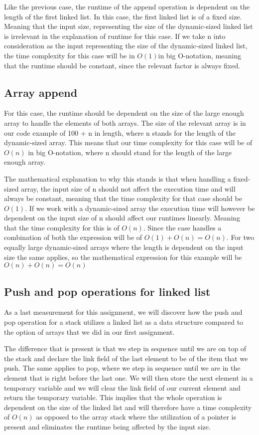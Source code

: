 \documentclass[a4paper,11pt]{article}
\begin{document}
        Like the previous case, the runtime of the append operation is dependent on the length of the first linked list. In this case, the first linked list is of a fixed size. Meaning that the input size, representing the size of the dynamic-sized linked list is irrelevant in the explanation of runtime for this case. If we take n into consideration as the input representing the size of the dynamic-sized linked list, the time complexity for this case will be in $O(1)$in big O-notation, meaning that the runtime should be constant, since the relevant factor is always fixed.

    \subsection*{Array append}

        For this case, the runtime should be dependent on the size of the large enough array to handle the elements of both arrays. The size of the relevant array is in our code example of 100 + n in length, where n stands for the length of the dynamic-sized array. This means that our time complexity for this case will be of $O(n)$ in big O-notation, where n should stand for the length of the large enough array. 
        
        The mathematical explanation to why this stands is that when handling a fixed-sized array, the input size of n should not affect the execution time and will always be constant, meaning that the time complexity for that case should be $O(1)$. If we work with a dynamic-sized array the execution time will however be dependent on the input size of n should affect our runtimes linearly. Meaning that the time complexity for this is of $O(n)$. Since the case handles a combination of both the expression will be of $O(1) + O(n) = O(n)$. For two equally large dynamic-sized arrays where the length is dependent on the input size the same applies, so the mathematical expression for this example will be $O(n) + O(n) = O(n)$

    \subsection*{Push and pop operations for linked list}

        As a last measurement for this assignment, we will discover how the push and pop operation for a stack utilizes a linked list as a data structure compared to the option of arrays that we did in our first assignment.

        The difference that is present is that we step in sequence until we are on top of the stack and declare the link field of the last element to be of the item that we push. The same applies to pop, where we step in sequence until we are in the element that is right before the last one. We will then store the next element in a temporary variable and we will clear the link field of our current element and return the temporary variable. This implies that the whole operation is dependent on the size of the linked list and will therefore have a time complexity of $O(n)$ as opposed to the array stack where the utilization of a pointer is present and eliminates the runtime being affected by the input size.     
    
    
\end{document}
